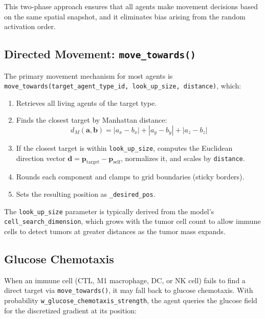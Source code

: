 This two-phase approach ensures that all agents make movement decisions based on the same spatial snapshot, and it eliminates bias arising from the random activation order.

\subsection{Directed Movement: \texttt{move\_towards()}}
\label{subsec:md_move_towards}

The primary movement mechanism for most agents is \texttt{move\_towards(target\_agent\_type\_id, look\_up\_size, distance)}, which:

\begin{enumerate}[nosep]
    \item Retrieves all living agents of the target type.
    \item Finds the closest target by Manhattan distance:
    \begin{equation}
        d_M(\mathbf{a}, \mathbf{b}) = |a_x - b_x| + |a_y - b_y| + |a_z - b_z|
        \label{eq:manhattan}
    \end{equation}
    \item If the closest target is within \texttt{look\_up\_size}, computes the Euclidean direction vector $\mathbf{d} = \mathbf{p}_{\text{target}} - \mathbf{p}_{\text{self}}$, normalizes it, and scales by \texttt{distance}.
    \item Rounds each component and clamps to grid boundaries (sticky borders).
    \item Sets the resulting position as \texttt{\_desired\_pos}.
\end{enumerate}

The \texttt{look\_up\_size} parameter is typically derived from the model's \texttt{cell\_search\_dimension}, which grows with the tumor cell count to allow immune cells to detect tumors at greater distances as the tumor mass expands.

\subsection{Glucose Chemotaxis}
\label{subsec:md_chemotaxis}

When an immune cell (CTL, M1 macrophage, DC, or NK cell) fails to find a direct target via \texttt{move\_towards()}, it may fall back to glucose chemotaxis. With probability \texttt{w\_glucose\_chemotaxis\_strength}, the agent queries the glucose field for the discretized gradient at its position:

